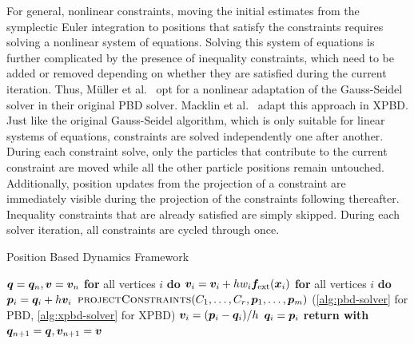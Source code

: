 For general, nonlinear constraints, moving the initial estimates from the symplectic Euler integration to positions that satisfy the constraints
requires solving a nonlinear system of equations. Solving this system of equations is further complicated by the presence of inequality constraints, which
need to be added or removed depending on whether they are satisfied during the current iteration. Thus, Müller et al.\ \cite{mueller2006} opt for a 
nonlinear adaptation of the Gauss-Seidel solver in their original PBD solver. Macklin et al.\ \cite{macklin2016} adapt this approach in XPBD. 
Just like the original Gauss-Seidel algorithm, which is only suitable for linear systems of equations, 
constraints are solved independently one after another. During each constraint solve, only the particles that contribute to the current constraint are
moved while all the other particle positions remain untouched. Additionally, position updates from the projection of a constraint are immediately 
visible during the projection of the constraints following thereafter. Inequality constraints that are already satisfied are simply skipped. 
During each solver iteration, all constraints are cycled through once.

\begin{algorithm}
\caption{Position Based Dynamics Framework}\label{alg:pbd}
\begin{algorithmic}[1]
\State $\bm{q} = \bm{q}_n, \bm{v} = \bm{v}_n$
\State \textbf{for} all vertices $i$ \textbf{do} $\bm{v}_i = \bm{v}_i + hw_i\bm{f}_{\text{ext}}(\bm{x}_i)$
\State \textbf{for} all vertices $i$ \textbf{do} $\bm{p}_i = \bm{q}_i + h\bm{v}_i$
\State $\textsc{projectConstraints}(C_1, \ldots, C_r, \bm{p}_1, \ldots, \bm{p}_m)$ (\cref{alg:pbd-solver} for PBD, 
\StatexIndent[2] \cref{alg:xpbd-solver} for XPBD)
\State $\bm{v}_i = (\bm{p}_i - \bm{q}_i) / h$
\State $\bm{q}_i = \bm{p}_i$
\EndFor
\State \textbf{return with } $\bm{q}_{n+1} = \bm{q}, \bm{v}_{n+1} = \bm{v}$
\EndProcedure
\end{algorithmic}
\end{algorithm}

